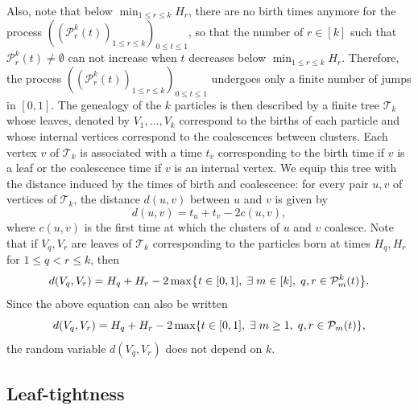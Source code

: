 \documentclass[AHL,Unicode,published]{cedram}
\newcommand{\1}{\mathbbm{1}}
\newcommand{\Part}{\mathcal{P}}
\newcommand{\T}{\mathcal{T}}
\let\originalleft\left
\let\originalright\right
\renewcommand{\left}{\mathopen{}\mathclose\bgroup\originalleft}
\renewcommand{\right}{\aftergroup\egroup\originalright}
\let\oldexists\exists
\renewcommand*{\exists}{\mathrel{\oldexists}}
\begin{document}
Also, note that below $\min_{1 \le r \le k} H_r$, there are no birth times anymore for the process $((\Part_r^k(t))_{1\leq r \leq k})_{0\leq t\leq 1}$, so that the number of $r\in [k]$ such that $\Part^k_r(t) \neq \emptyset$ can not increase when $t$ decreases {below $\min_{1 \le r \le k} H_r$}. Therefore, the process $((\Part_r^k(t))_{1\leq r \leq k})_{0\leq t\leq 1}$ undergoes only a finite number of jumps in $[0,1]$. The genealogy of the $k$ particles is then described by a finite tree $\T_k$ whose leaves, denoted by $V_1,\dots,V_k$ correspond to the births of each particle and whose internal vertices correspond to the coalescences between clusters. Each vertex $v$ of $\T_k$ is associated with a time $t_v$ corresponding to the birth time if $v$ is a leaf or the coalescence time {if} $v$ is an internal vertex. We equip this tree with the distance induced by the times of birth and coalescence: for every pair $u,v$ of vertices of $\T_k$, the distance $d(u,v)$ between $u$ and $v$ is given by
\[
d(u,v) = t_u+t_v-2c(u,v),
\]
where $c(u,v)$ is the first time at which the clusters of $u$ and $v$ coalesce. Note that if $V_q,V_r$ are leaves of $\T_k$ corresponding to the particles born at times $H_q,H_r$ for $1 \le q<r\le k$, then
\begin{equation}\label{eq lien distance coalescent continu}
d(V_q,V_r)= H_q+H_r - 2\max \left\{t \in [0,1], \; \exists m\in [k], \; q,r \in \Part^k_m(t) \right\}.
\end{equation}
Since the above equation can also be written
\[
d(V_q,V_r)= H_q+H_r - 2\max \left\{t \in [0,1], \; \exists m\ge1, \; q,r \in  \Part_m(t) \right\},
\]
the random variable $d(V_q,V_r)$ does not depend on $k$.

\subsection{Leaf-tightness} \label{sec:continuum_leaf-tight}
\end{document}
